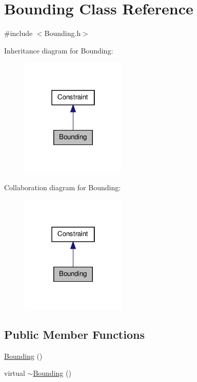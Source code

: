 \hypertarget{classBounding}{\section{\-Bounding \-Class \-Reference}
\label{classBounding}
}


{\ttfamily \#include $<$\-Bounding.\-h$>$}



\-Inheritance diagram for \-Bounding\-:
\nopagebreak
\begin{figure}[H]
\begin{center}
\leavevmode
\includegraphics[width=142pt]{classBounding__inherit__graph}
\end{center}
\end{figure}


\-Collaboration diagram for \-Bounding\-:
\nopagebreak
\begin{figure}[H]
\begin{center}
\leavevmode
\includegraphics[width=142pt]{classBounding__coll__graph}
\end{center}
\end{figure}
\subsection*{\-Public \-Member \-Functions}
\begin{DoxyCompactItemize}
\item 
\hyperlink{classBounding_ab8478542374a91a79e47ef8bea4c3fca}{\-Bounding} ()
\item 
virtual \hyperlink{classBounding_a8e3b81ea2078454840fe93a44f634d56}{$\sim$\-Bounding} ()
\end{DoxyCompactItemize}
